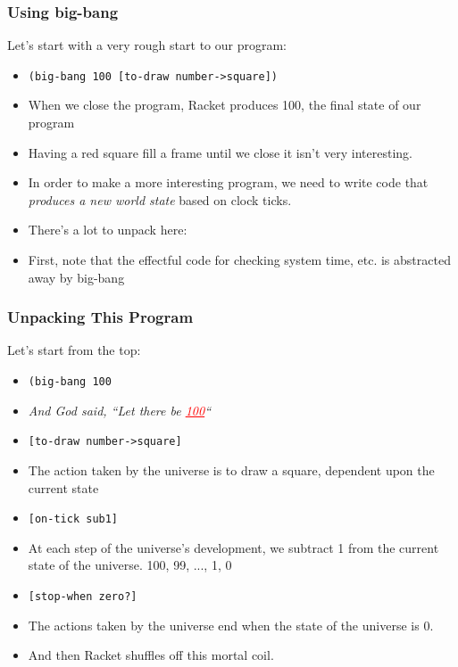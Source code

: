 \documentclass{beamer}
\begin{document}

\begin{frame}
  \frametitle{Using big-bang}
  Let's start with a very rough start to our program:
  \begin{itemize}
  \item<2-> \texttt{(big-bang 100 [to-draw number->square])}
  \item<3-> When we close the program, Racket produces 100, the final state
    of our program
  \item<4-> Having a red square fill a frame until we close it isn't very interesting.
  \item<5-> In order to make a more interesting program, we need to write code
    that \emph{produces a new world state} based on clock ticks.
  \item<6-> There's a lot to unpack here:
    \firstBigBang
  \item<7-> First, note that the effectful code for checking system time, etc.
    is abstracted away by big-bang
  \end{itemize}
\end{frame}

\begin{frame}
  \frametitle{Unpacking This Program}
  Let's start from the top:
  \begin{itemize}
  \item<2-> \texttt{(big-bang 100}
  \item<3-> \emph{And God said, ``Let there be \textcolor{red}{\underline{100}}``}
  \item<4-> \texttt{[to-draw number->square]}
  \item<5-> The action taken by the universe is to draw a square, dependent upon
    the current state
  \item<6-> \texttt{[on-tick sub1]}
  \item<7-> At each step of the universe's development, we subtract 1 from
    the current state of the universe. 100, 99, ..., 1, 0
  \item<8-> \texttt{[stop-when zero?]}
  \item<9-> The actions taken by the universe end when the state of the universe
    is 0.
  \item<10-> And then Racket shuffles off this mortal coil.
  \end{itemize}
\end{frame}
\end{document}
